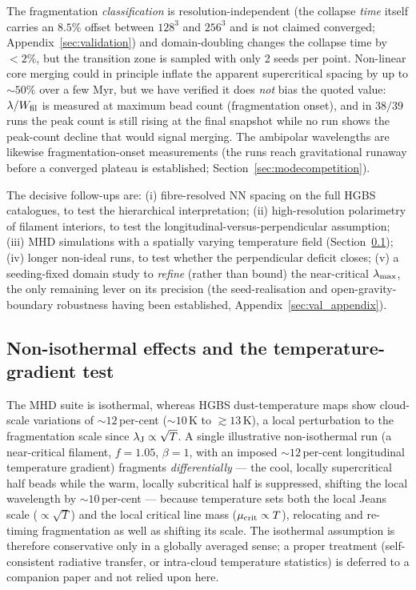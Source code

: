 \documentclass[usenatbib,twoside,twocolumn]{mnras}
\begin{document}
The fragmentation \emph{classification} is resolution-independent (the collapse \emph{time} itself carries an $8.5\%$ offset between $128^3$ and $256^3$ and is not claimed converged; Appendix~\ref{sec:validation}) and domain-doubling changes the collapse time by $<2\%$, but the transition zone is sampled with only 2 seeds per point. Non-linear core merging could in principle inflate the apparent supercritical spacing by up to $\sim50\%$ over a few Myr, but we have verified it does \emph{not} bias the quoted value: $\lambda/W_{\rm fil}$ is measured at maximum bead count (fragmentation onset), and in $38/39$ runs the peak count is still rising at the final snapshot while no run shows the peak-count decline that would signal merging. The ambipolar wavelengths are likewise fragmentation-onset measurements (the runs reach gravitational runaway before a converged plateau is established; Section~\ref{sec:modecompetition}).

The decisive follow-ups are: (i) fibre-resolved NN spacing on the full HGBS catalogues, to test the hierarchical interpretation; (ii) high-resolution polarimetry of filament interiors, to test the longitudinal-versus-perpendicular assumption; (iii) MHD simulations with a spatially varying temperature field (Section~\ref{sec:mt_variation}); (iv) longer non-ideal runs, to test whether the perpendicular deficit closes; (v) a seeding-fixed domain study to \emph{refine} (rather than bound) the near-critical $\lambda_{\rm max}$, the only remaining lever on its precision (the seed-realisation and open-gravity-boundary robustness having been established, Appendix~\ref{sec:val_appendix}).


\subsection{Non-isothermal effects and the temperature-gradient test}
\label{sec:mt_variation}

The MHD suite is isothermal, whereas HGBS dust-temperature maps show cloud-scale variations of $\sim12$\,per-cent ($\sim10$\,K to $\gtrsim13$\,K), a local perturbation to the fragmentation scale since $\lambda_{\rm J}\propto\sqrt{T}$. A single illustrative non-isothermal run (a near-critical filament, $f=1.05$, $\beta=1$, with an imposed $\sim12$\,per-cent longitudinal temperature gradient) fragments \emph{differentially} --- the cool, locally supercritical half beads while the warm, locally subcritical half is suppressed, shifting the local wavelength by $\sim10$\,per-cent --- because temperature sets both the local Jeans scale ($\propto\sqrt{T}$) and the local critical line mass ($\mu_{\rm crit}\propto T$), relocating and re-timing fragmentation as well as shifting its scale. The isothermal assumption is therefore conservative only in a globally averaged sense; a proper treatment (self-consistent radiative transfer, or intra-cloud temperature statistics) is deferred to a companion paper and not relied upon here.
\end{document}
